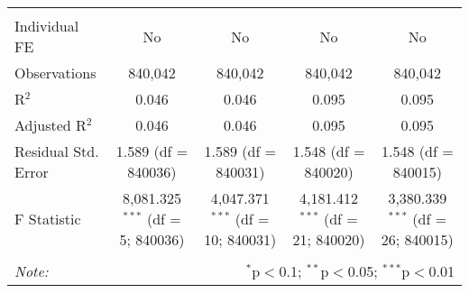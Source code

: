\documentclass[
]{article}
\begin{document}
\begin{table}[!htbp]
{\begin{tabular}{@{\extracolsep{5pt}}lcccc}
\hline \\[-1.8ex] 
Individual FE & No & No & No & No \\ 
Observations & 840,042 & 840,042 & 840,042 & 840,042 \\ 
R$^{2}$ & 0.046 & 0.046 & 0.095 & 0.095 \\ 
Adjusted R$^{2}$ & 0.046 & 0.046 & 0.095 & 0.095 \\ 
Residual Std. Error & 1.589 (df = 840036) & 1.589 (df = 840031) & 1.548 (df = 840020) & 1.548 (df = 840015) \\ 
F Statistic & 8,081.325$^{***}$ (df = 5; 840036) & 4,047.371$^{***}$ (df = 10; 840031) & 4,181.412$^{***}$ (df = 21; 840020) & 3,380.339$^{***}$ (df = 26; 840015) \\ 
\hline 
\hline \\[-1.8ex] 
\textit{Note:}  & \multicolumn{4}{r}{$^{*}$p$<$0.1; $^{**}$p$<$0.05; $^{***}$p$<$0.01} \\ 
\end{tabular}
} 
\end{table} 
\newpage
\end{document}
